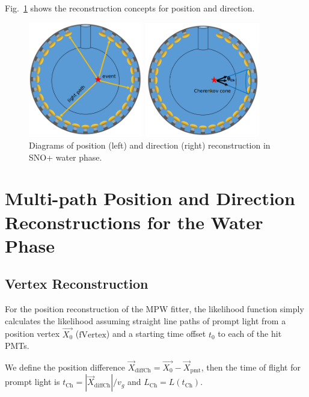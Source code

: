Fig.~\ref{mpwdiagram} shows the reconstruction concepts for position and direction.
\begin{figure}[htbp]
	\centering
	\begin{minipage}[t]{0.45\textwidth}
		\centering
		\includegraphics[width=5cm]{mpwDiagram.png}
	\end{minipage}
	\begin{minipage}[t]{0.4\textwidth}
		\centering
		\includegraphics[width=5cm]{mpwDiagram2.png}
	\end{minipage}
	\caption{Diagrams of position (left) and direction (right) reconstruction in SNO+ water phase.}
	\label{mpwdiagram}
\end{figure}
	
\section{Multi-path Position and Direction Reconstructions for the Water Phase}

\subsection{Vertex Reconstruction}
For the position reconstruction of the MPW fitter, the likelihood function simply calculates the likelihood assuming straight line paths of prompt light from a position vertex $\vec{X_0}$ ($\mathrm{fVertex}$) and a starting time offset $t_0$ to each of the hit PMTs. 

We define the position difference $\vec{X}_{{\mathrm{diffCh}}} = \vec{X_0}-\vec{X}_{\mathrm{pmt}}$, then the time of flight for prompt light is  $t_{\mathrm{Ch}}=|\vec{X}_{{\mathrm{diffCh}}}|/v_g$ and $L_{\mathrm{Ch}}=L(t_{\mathrm{Ch}})$.

